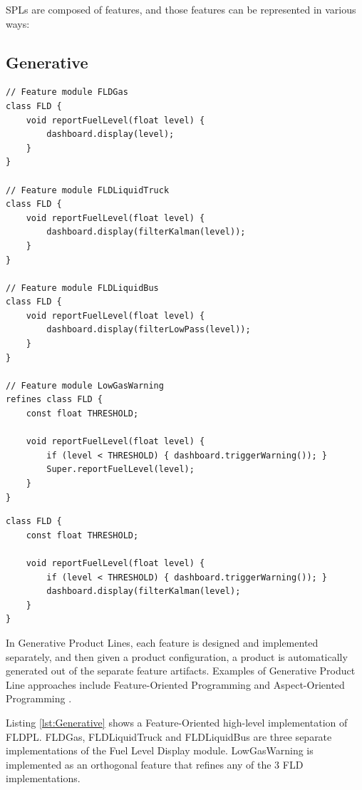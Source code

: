 \documentclass[11pt]{article}
\begin{document}
SPLs are composed of features, and those features can be represented in various ways:


\subsection{Generative}

\begin{lstlisting}[caption=Generative FLDPL, label={lst:Generative}, float]
// Feature module FLDGas
class FLD {
	void reportFuelLevel(float level) { 
		dashboard.display(level); 
	}
}

// Feature module FLDLiquidTruck
class FLD {
	void reportFuelLevel(float level) { 
		dashboard.display(filterKalman(level)); 
	}
}

// Feature module FLDLiquidBus
class FLD {
	void reportFuelLevel(float level) { 
		dashboard.display(filterLowPass(level)); 
	}
}

// Feature module LowGasWarning
refines class FLD {
	const float THRESHOLD;

	void reportFuelLevel(float level) { 
		if (level < THRESHOLD) { dashboard.triggerWarning()); }
		Super.reportFuelLevel(level);
	}
} 
\end{lstlisting}

\begin{lstlisting}[caption=Generated FLD Product, label={lst:Generated}, float]
class FLD {
	const float THRESHOLD;

	void reportFuelLevel(float level) { 
		if (level < THRESHOLD) { dashboard.triggerWarning()); }
		dashboard.display(filterKalman(level);
	}
} 
\end{lstlisting}

In Generative Product Lines, each feature is designed and implemented separately, and then given a product configuration, a product is automatically generated out of the separate feature artifacts. Examples of Generative Product Line approaches include Feature-Oriented Programming \cite{Prehofer1997} and Aspect-Oriented Programming \cite{Kiczales1997}.

Listing \ref{lst:Generative} shows a Feature-Oriented high-level implementation of FLDPL. FLDGas, FLDLiquidTruck and FLDLiquidBus are three separate implementations of the Fuel Level Display module. LowGasWarning is implemented as an orthogonal feature that refines any of the 3 FLD implementations. 
\end{document}
